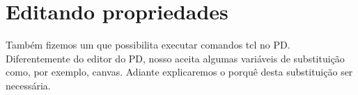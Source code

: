 \chapter{Editando propriedades}

Também fizemos um \external que possibilita executar comandos tcl no PD.
Diferentemente do editor do PD, nosso \external aceita algumas variáveis
de substituição como, por exemplo, canvas.
Adiante explicaremos o porquê desta substituição ser necessária.


